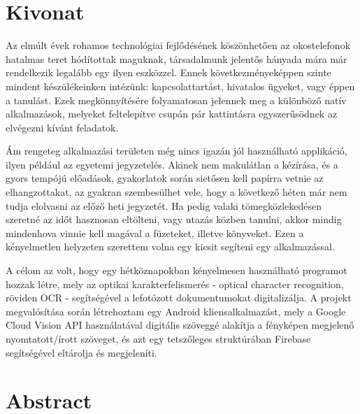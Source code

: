 \setcounter{page}{1}

\selecthungarian

\chapter*{Kivonat}

Az elmúlt évek rohamos technológiai fejlődésének köszönhetően az okostelefonok hatalmas teret hódítottak maguknak, társadalmunk jelentős hányada mára már rendelkezik legalább egy ilyen eszközzel. Ennek következményeképpen szinte mindent készülékeinken intézünk: kapcsolattartást, hivatalos ügyeket, vagy éppen a tanulást. Ezek megkönnyítésére folyamatosan jelennek meg a különböző natív alkalmazások, melyeket feltelepítve csupán pár kattintásra egyszerűsödnek az elvégezni kívánt feladatok. 

Ám rengeteg alkalmazási területen még nincs igazán jól használható applikáció, ilyen például az egyetemi jegyzetelés. Akinek nem makulátlan a kézírása, és a gyors tempójú előadások, gyakorlatok során sietősen kell papírra vetnie az elhangzottakat, az gyakran szembesülhet vele, hogy a következő héten már nem tudja elolvasni az előző heti jegyzetét. Ha pedig valaki tömegközlekedésen szeretné az időt hasznosan eltölteni, vagy utazás közben tanulni, akkor mindig mindenhova vinnie kell magával a füzeteket, illetve könyveket. Ezen a kényelmetlen helyzeten szerettem volna egy kicsit segíteni egy alkalmazással.

A célom az volt, hogy egy hétköznapokban kényelmesen használható programot hozzak létre, mely az optikai karakterfelismerés - optical character recognition, röviden OCR - segítségével a lefotózott dokumentumokat digitalizálja. A projekt megvalósítása során létrehoztam egy Android kliensalkalmazást, mely a Google Cloud Vision API használatával digitális szöveggé alakítja a fényképen megjelenő nyomtatott/írott szöveget, és azt egy tetszőleges struktúrában Firebase segítségével eltárolja és megjeleníti. 

\vfill
\selectenglish


\chapter*{Abstract}

